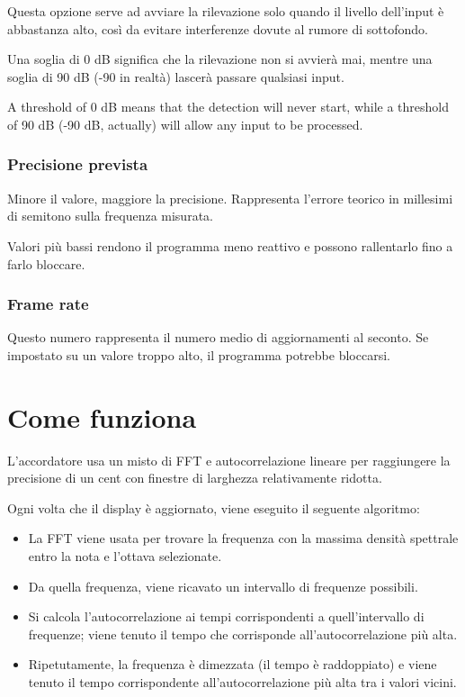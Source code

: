 Questa opzione serve ad avviare la rilevazione solo quando il livello
dell'input è abbastanza alto, così da evitare interferenze dovute al
rumore di sottofondo.

Una soglia di 0 dB significa che la rilevazione non si avvierà mai,
mentre una soglia di 90 dB (-90 in realtà) lascerà passare
qualsiasi input.

A threshold of 0 dB means that the detection will never start, while a threshold
of 90 dB (-90 dB, actually) will allow any input to be processed.

\subsection{Precisione prevista}\label{expectedprecision}

Minore il valore, maggiore la precisione. Rappresenta l'errore
teorico in millesimi di semitono sulla frequenza misurata.

Valori più bassi rendono il programma meno reattivo e
possono rallentarlo fino a farlo bloccare.

\subsection{Frame rate}\label{framerate}

Questo numero rappresenta il numero medio di aggiornamenti al
seconto. Se impostato su un valore troppo alto, il programma
potrebbe bloccarsi.

\chapter{Come funziona}\label{howitworks}

L'accordatore  usa un misto di FFT e autocorrelazione
lineare per raggiungere la precisione di un cent con
finestre di larghezza relativamente ridotta.

Ogni volta che il display è aggiornato, viene eseguito il seguente algoritmo:
\begin{itemize}
  \item La FFT viene usata per trovare la frequenza con la massima densità spettrale entro la nota e l'ottava selezionate.
  \item Da quella frequenza, viene ricavato un intervallo di frequenze possibili.
  \item Si calcola l'autocorrelazione ai tempi corrispondenti a quell'intervallo di frequenze; viene tenuto il tempo che corrisponde all'autocorrelazione più alta.
  \item Ripetutamente, la frequenza è dimezzata (il tempo è raddoppiato) e viene tenuto il tempo corrispondente all'autocorrelazione più alta tra i valori vicini.
\end{itemize}

